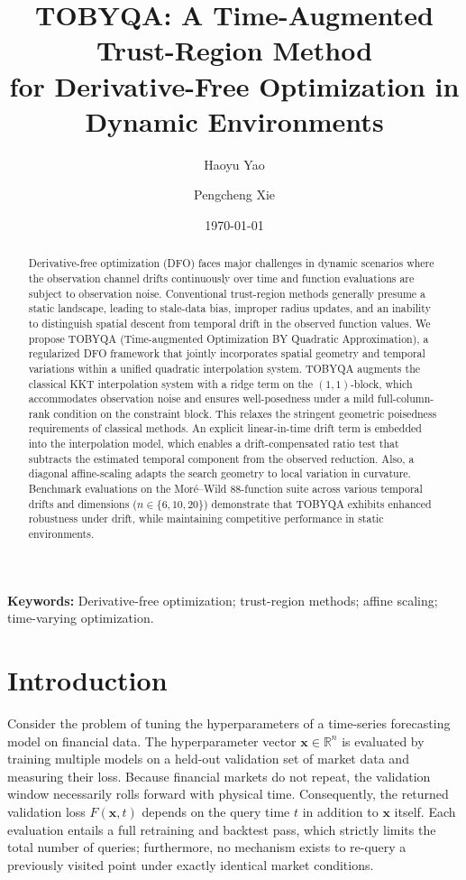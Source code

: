 \documentclass[11pt,a4paper]{article}
\title{\bfseries TOBYQA: A Time-Augmented Trust-Region Method \\
       for Derivative-Free Optimization in Dynamic Environments}
\author[1]{Haoyu Yao}
\author[2,\,$\dagger$]{Pengcheng Xie}
\affil[1]{School of Computer Science and Technology, Xi'an Jiaotong University, Xi'an, China \\
          \texttt{julius06@foxmail.com}}
\affil[2]{Lawrence Berkeley National Laboratory, Berkeley, CA, United States \\
          \texttt{pxie@lbl.gov}}
\affil[$\dagger$]{Corresponding author.}
\date{\today}
\begin{document}
\maketitle

\begin{abstract}
Derivative-free optimization (DFO) faces major challenges in dynamic
scenarios where the observation channel drifts continuously over time
and function evaluations are subject to observation noise. Conventional
trust-region methods generally presume a static landscape, leading to
stale-data bias, improper radius updates, and an inability to
distinguish spatial descent from temporal drift in the observed
function values. We propose TOBYQA (Time-augmented Optimization
BY Quadratic Approximation), a regularized DFO framework that jointly
incorporates spatial geometry and temporal variations within a unified
quadratic interpolation system. TOBYQA augments the classical KKT
interpolation system with a ridge term on the $(1,1)$-block, which
accommodates observation noise and ensures well-posedness under a mild
full-column-rank condition on the constraint block. This relaxes the
stringent geometric poisedness requirements of classical methods. An
explicit linear-in-time drift term is embedded into the interpolation
model, which enables a drift-compensated ratio test that subtracts the
estimated temporal component from the observed reduction. Also, a diagonal
affine-scaling adapts the search geometry to local variation in
curvature. Benchmark evaluations on the Mor\'e--Wild $88$-function
suite across various temporal drifts and dimensions
($n \in \{6,10,20\}$) demonstrate that TOBYQA exhibits enhanced
robustness under drift, while maintaining competitive performance in
static environments.
\end{abstract}

\noindent\textbf{Keywords:} Derivative-free optimization; trust-region methods; affine scaling; time-varying optimization.
\vspace{1em}

\section{Introduction}\label{sec:intro}

Consider the problem of tuning the hyperparameters of a time-series forecasting model on financial data. The hyperparameter vector $\bm{x}\in\mathbb{R}^{n}$ is evaluated by training multiple models on a held-out validation set of market data and measuring their loss. Because financial markets do not repeat, the validation window necessarily rolls forward with physical time. Consequently, the returned validation loss $F(\bm{x},t)$ depends on the query time $t$ in addition to $\bm{x}$ itself. Each evaluation entails a full retraining and backtest pass, which strictly limits the total number of queries; furthermore, no mechanism exists to re-query a previously visited point under exactly identical market conditions.
\end{document}
